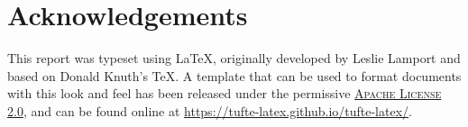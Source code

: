 \documentclass{tufte-handout}
\begin{document}
\section{Acknowledgements}\label{sec:support}

This report was typeset using \LaTeX, originally developed by Leslie Lamport and based on Donald Knuth's \TeX. A template that can be used to format documents with this look and feel has been released under the permissive \href{http://www.apache.org/licenses/LICENSE-2.0}{\textsc{Apache License 2.0}}, and can be found online at \url{https://tufte-latex.github.io/tufte-latex/}.



\end{document}
